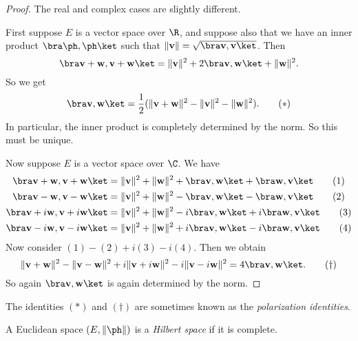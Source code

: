 \documentclass[a4paper]{article}
\begin{document}
\begin{proof}
  The real and complex cases are slightly different.

  First suppose $E$ is a vector space over $\R$, and suppose also that we have an inner product $\bra \ph,\ph\ket$ such that $\|\mathbf{v}\| = \sqrt{\bra \mathbf{v}, \mathbf{v}\ket }$. Then
  \[
    \bra \mathbf{v} + \mathbf{w}, \mathbf{v} + \mathbf{w}\ket = \|\mathbf{v}\|^2 + 2\bra \mathbf{v}, \mathbf{w}\ket + \|\mathbf{w}\|^2.
  \]
  So we get
  \[
    \bra \mathbf{v}, \mathbf{w}\ket = \frac{1}{2} (\|\mathbf{v} + \mathbf{w}\|^2 - \|\mathbf{v}\|^2 - \|\mathbf{w}\|^2).\tag{$*$}
  \]
  In particular, the inner product is completely determined by the norm. So this must be unique.

  Now suppose $E$ is a vector space over $\C$. We have
  \begin{align*}
    \bra \mathbf{v} + \mathbf{w}, \mathbf{v} + \mathbf{w}\ket &= \|\mathbf{v}\|^2 + \|\mathbf{w}\|^2 + \bra \mathbf{v}, \mathbf{w}\ket + \bra \mathbf{w}, \mathbf{v}\ket\tag{1}\\
    \bra \mathbf{v} - \mathbf{w}, \mathbf{v} - \mathbf{w}\ket &= \|\mathbf{v}\|^2 + \|\mathbf{w}\|^2 - \bra \mathbf{v}, \mathbf{w}\ket - \bra \mathbf{w}, \mathbf{v}\ket\tag{2}\\
    \bra \mathbf{v} +i\mathbf{w}, \mathbf{v} +i\mathbf{w}\ket &= \|\mathbf{v}\|^2 + \|\mathbf{w}\|^2 -i\bra \mathbf{v}, \mathbf{w}\ket +i\bra \mathbf{w}, \mathbf{v}\ket\tag{3}\\
    \bra \mathbf{v} -i\mathbf{w}, \mathbf{v} -i\mathbf{w}\ket &= \|\mathbf{v}\|^2 + \|\mathbf{w}\|^2 +i\bra \mathbf{v}, \mathbf{w}\ket -i\bra \mathbf{w}, \mathbf{v}\ket\tag{4}
  \end{align*}
  Now consider $(1) - (2) + i(3) - i(4)$. Then we obtain
  \[
    \|\mathbf{v} + \mathbf{w}\|^2 - \|\mathbf{v} - \mathbf{w}\|^2 + i\|\mathbf{v} + i\mathbf{w}\|^2 - i\|\mathbf{v} - i\mathbf{w}\|^2 = 4\bra \mathbf{v}, \mathbf{w}\ket.\tag{$\dagger$}
  \]
  So again $\bra \mathbf{v}, \mathbf{w}\ket$ is again determined by the norm.
\end{proof}
The identities $(*)$ and $(\dagger)$ are sometimes known as the \emph{polarization identities}.

\begin{defi}
  A Euclidean space $(E, \|\ph\|)$ is a \emph{Hilbert space} if it is complete.
\end{defi}
\end{document}
